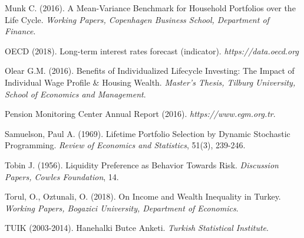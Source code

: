 \documentclass[]{article}
\begin{document}
\begin{description}
\item Munk C. (2016). A Mean-Variance Benchmark for Household Portfolios over the Life Cycle. \textit{Working Papers, Copenhagen Business School, Department of Finance}.
\item OECD (2018). Long-term interest rates forecast (indicator). \textit{https://data.oecd.org}
\item Olear G.M. (2016). Benefits of Individualized Lifecycle Investing: The Impact of Individual Wage Profile \& Housing Wealth. \textit{Master's Thesis, Tilburg University, School of Economics and Management}.
\item Pension Monitoring Center Annual Report (2016). \textit{https://www.egm.org.tr}.
\item Samuelson, Paul A. (1969). Lifetime Portfolio Selection by Dynamic Stochastic Programming. \textit{Review of Economics and Statistics}, 51(3), 239-246.
\item Tobin J. (1956). Liquidity Preference as Behavior Towards Risk. \textit{Discussion Papers, Cowles Foundation}, 14.
\item Torul, O., Oztunali, O. (2018). On Income and Wealth Inequality in Turkey. \textit{Working Papers, Bogazici University, Department of Economics}.
\item TUIK (2003-2014). Hanehalki Butce Anketi. \textit{Turkish Statistical Institute}.
\end{description}
\endgroup
\end{document}
